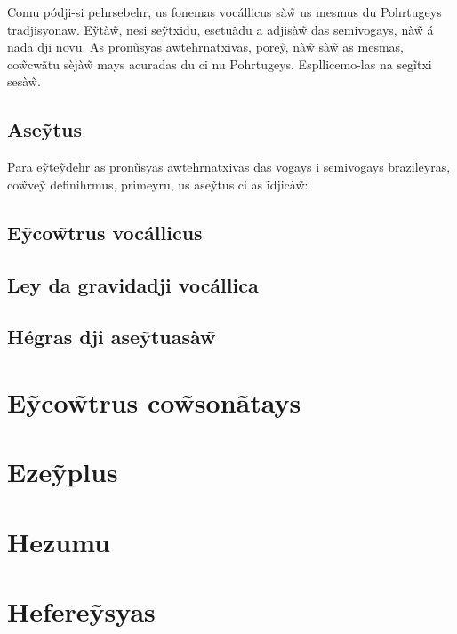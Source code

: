 \documentclass[12pt, a5paper, titlepage]{article}
\begin{document}
\begin{bilingualpages}
    Comu pódji-si pehrsebehr, us fonemas vocállicus sà\~w us mesmus du Pohrtugeys
    tradjisyonaw. E\~ytà\~w, nesi se\~ytxidu, esetuãdu a adjisà\~w das semivogays,
    nà\~w á nada dji novu. As pronũsyas awtehrnatxivas, pore\~y, nà\~w sà\~w as
    mesmas, co\~wcwãtu sèjà\~w mays acuradas du ci nu Pohrtugeys. Espllicemo-las na
    segĩtxi sesà\~w.

    \subsection{Ase\~ytus}
    Para e\~yte\~ydehr as pronũsyas awtehrnatxivas das vogays i semivogays
    brazileyras, co\~wve\~y definihrmus, primeyru, us ase\~ytus ci as ĩdjicà\~w:

    \BrTableDiacritics

    \subsection{E\~yco\~wtrus vocállicus}
    \subsection{Ley da gravidadji vocállica}
    \subsection{Hégras dji ase\~ytuasà\~w}

    \section{E\~yco\~wtrus co\~wsonãtays}

    \section{Eze\~yplus}

\end{bilingualpages}

\newpage
\section{Hezumu}

\newpage
\section{Hefere\~ysyas}
\end{document}
